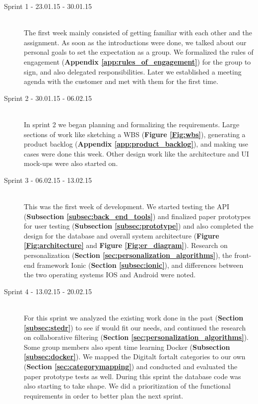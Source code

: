 \begin{description}
	
	\item[Sprint 1 - 23.01.15 - 30.01.15] \hfill \\ 
	The first week mainly consisted of getting familiar with each other and the assignment. As soon as the introductions were done, we talked about our personal goals to set the expectation as a group. We formalized the rules of engagement (\textbf{Appendix \ref{app:rules_of_engagement}}) for the group to sign, and also delegated responsibilities. Later we established a meeting agenda with the customer and met with them for the first time.
	
	\item[Sprint 2 - 30.01.15 - 06.02.15] \hfill \\ 
	In sprint 2 we began planning and formalizing the requirements. Large sections of work like sketching a WBS (\textbf{Figure \ref{Fig:wbs}}), generating a product backlog (\textbf{Appendix \ref{app:product_backlog}}), and making use cases were done this week. Other design work like the architecture and UI mock-ups were also started on.
	
	\item[Sprint 3 - 06.02.15 - 13.02.15] \hfill \\ 
	This was the first week of development. We started testing the API (\textbf{Subsection \ref{subsec:back_end_tools}}) and finalized paper prototypes for user testing (\textbf{Subsection \ref{subsec:prototype}}) and also completed the design for the database and overall system architecture (\textbf{Figure \ref{Fig:architecture}} and \textbf{Figure \ref{Fig:er_diagram}}). Research on personalization (\textbf{Section \ref{sec:personalization_algorithms}}), the front-end framework Ionic (\textbf{Section \ref{subsec:ionic}}), and differences between the two operating systems IOS and Android were noted.
	
	\item[Sprint 4 - 13.02.15 - 20.02.15] \hfill \\ 
	For this sprint we analyzed the existing work done in the past (\textbf {Section \ref{subsec:stedr}}) to see if would fit our needs, and continued the research on collaborative filtering (\textbf {Section \ref{sec:personalization_algorithms}}). Some group members also spent time learning Docker (\textbf {Subsection \ref{subsec:docker}}). We mapped the Digitalt fortalt categories to our own (\textbf{Section \ref{sec:categorymapping}}) and conducted and evaluated the paper prototype tests as well. During this sprint the database code was also starting to take shape. We did a prioritization of the functional requirements in order to better plan the next sprint.  
	

\end{description}
